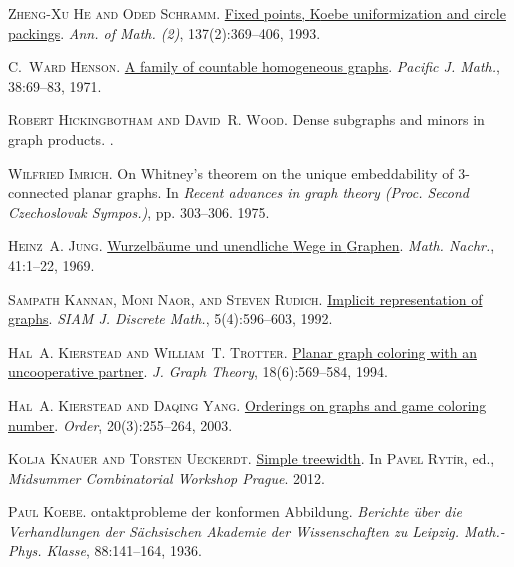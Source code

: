 \documentclass[a4paper,11pt]{article}
\theoremstyle{plain}
\theoremstyle{definition}
\begin{document}
\textsc{Zheng-Xu He and Oded Schramm}.
\newblock \href{https://doi.org/10.2307/2946541}{Fixed points, {K}oebe
  uniformization and circle packings}.
\newblock \emph{Ann. of Math. (2)}, 137(2):369--406, 1993.

\textsc{C.~Ward Henson}.
\newblock \href{https://projecteuclid.org/euclid.pjm/1102970260}{A family of
  countable homogeneous graphs}.
\newblock \emph{Pacific J. Math.}, 38:69--83, 1971.

\textsc{Robert Hickingbotham and David~R. Wood}.
\newblock Dense subgraphs and minors in graph products.
.

\textsc{Wilfried Imrich}.
\newblock On {W}hitney's theorem on the unique embeddability of {$3$}-connected
  planar graphs.
\newblock In \emph{Recent advances in graph theory ({P}roc. {S}econd
  {C}zechoslovak {S}ympos.)}, pp. 303--306. 1975.

\textsc{Heinz~A. Jung}.
\newblock \href{https://doi.org/10.1002/mana.19690410102}{Wurzelb\"{a}ume und
  unendliche {W}ege in {G}raphen}.
\newblock \emph{Math. Nachr.}, 41:1--22, 1969.

\textsc{Sampath Kannan, Moni Naor, and Steven Rudich}.
\newblock \href{https://doi.org/10.1137/0405049}{Implicit representation of
  graphs}.
\newblock \emph{SIAM J. Discrete Math.}, 5(4):596--603, 1992.

\textsc{Hal~A. Kierstead and William~T. Trotter}.
\newblock \href{https://doi.org/10.1002/jgt.3190180605}{Planar graph coloring
  with an uncooperative partner}.
\newblock \emph{J. Graph Theory}, 18(6):569--584, 1994.

\textsc{Hal~A. Kierstead and Daqing Yang}.
\newblock \href{https://doi.org/10.1023/B:ORDE.0000026489.93166.cb}{Orderings
  on graphs and game coloring number}.
\newblock \emph{Order}, 20(3):255--264, 2003.

\textsc{Kolja Knauer and Torsten Ueckerdt}.
\newblock
  \href{https://kam.mff.cuni.cz/workshops/mcw/work18/mcw2012booklet.pdf}{Simple
  treewidth}.
\newblock In \textsc{Pavel Ryt\'ir}, ed., \emph{Midsummer Combinatorial
  Workshop Prague}. 2012.

\textsc{Paul Koebe}.
ontaktprobleme der konformen {A}bbildung.
\newblock \emph{Berichte {\"u}ber die Verhandlungen der S{\"a}chsischen
  Akademie der Wissenschaften zu Leipzig. Math.-Phys. Klasse}, 88:141--164,
  1936.
\end{document}
